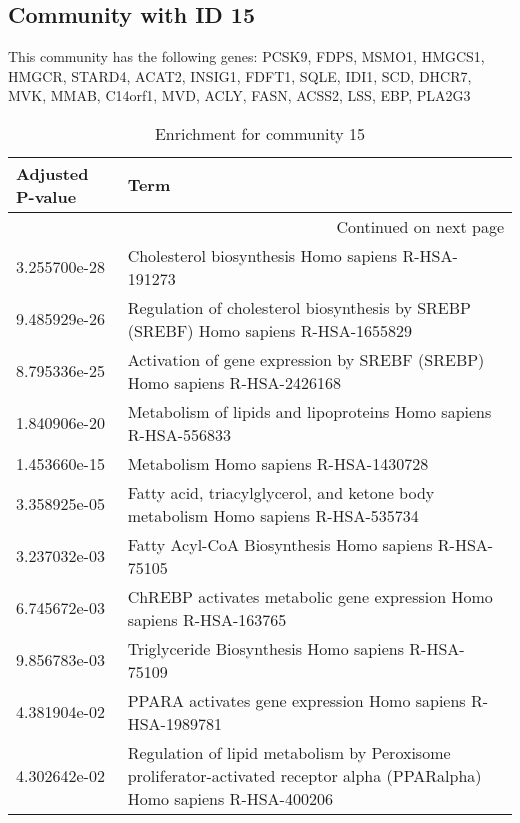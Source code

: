 \subsection*{Community with ID 15}
This community has the following genes: PCSK9, FDPS, MSMO1, HMGCS1, HMGCR, STARD4, ACAT2, INSIG1, FDFT1, SQLE, IDI1, SCD, DHCR7, MVK, MMAB, C14orf1, MVD, ACLY, FASN, ACSS2, LSS, EBP, PLA2G3
\\
\begin{longtable}{p{2.4cm}p{14.5cm}}
\caption{Enrichment for community 15}\\
\toprule
Adjusted \newline P-value &                                                                                                                      Term \\
\midrule
\endhead
\midrule
\multicolumn{2}{r}{{Continued on next page}} \\
\midrule
\endfoot

\bottomrule
\endlastfoot
             3.255700e-28 &                                                                        Cholesterol biosynthesis Homo sapiens R-HSA-191273 \\
             9.485929e-26 &                                        Regulation of cholesterol biosynthesis by SREBP (SREBF) Homo sapiens R-HSA-1655829 \\
             8.795336e-25 &                                                 Activation of gene expression by SREBF (SREBP) Homo sapiens R-HSA-2426168 \\
             1.840906e-20 &                                                           Metabolism of lipids and lipoproteins Homo sapiens R-HSA-556833 \\
             1.453660e-15 &                                                                                     Metabolism Homo sapiens R-HSA-1430728 \\
             3.358925e-05 &                                         Fatty acid, triacylglycerol, and ketone body metabolism Homo sapiens R-HSA-535734 \\
             3.237032e-03 &                                                                      Fatty Acyl-CoA Biosynthesis Homo sapiens R-HSA-75105 \\
             6.745672e-03 &                                                      ChREBP activates metabolic gene expression Homo sapiens R-HSA-163765 \\
             9.856783e-03 &                                                                        Triglyceride Biosynthesis Homo sapiens R-HSA-75109 \\
             4.381904e-02 &                                                                PPARA activates gene expression Homo sapiens R-HSA-1989781 \\
             4.302642e-02 &  Regulation of lipid metabolism by Peroxisome proliferator-activated receptor alpha (PPARalpha) Homo sapiens R-HSA-400206 \\
\end{longtable}


